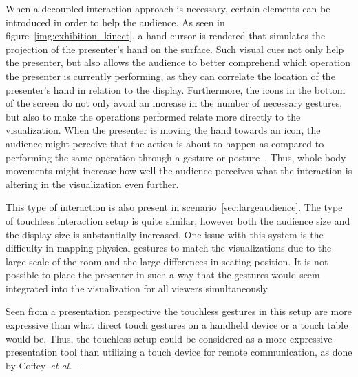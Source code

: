 \documentclass[review,journal]{vgtc}         %
\newcommand{\todo}[1]{\textbf{\textcolor{red}{[TODO: {#1}]}}}
\begin{document}
When a decoupled interaction approach is necessary, certain elements can be introduced in order to help the audience.
As seen in figure~\ref{img:exhibition_kinect}, a hand cursor is rendered that simulates the projection of the presenter's hand on the surface.
Such visual cues not only help the presenter, but also allows the audience to better comprehend which operation the presenter is currently performing, as they can correlate the location of the presenter's hand in relation to the display.
Furthermore, the icons in the bottom of the screen do not only avoid an increase in the number of necessary gestures, but also to make the operations performed relate more directly to the visualization. 
When the presenter is moving the hand towards an icon, the audience might perceive that the action is about to happen as compared to performing the same operation through a gesture or posture~\cite{isenberg:hal-00781237}. 
Thus, whole body movements \cite{978-0-85729-432-6, Shoemaker:2010:BIT:1868914.1868967} might increase how well the audience perceives what the interaction is altering in the visualization even further.

This type of interaction is also present in scenario~\ref{sec:largeaudience}. The type of touchless interaction setup is quite similar, however both the audience size and the display size is substantially increased.
One issue with this system is the difficulty in mapping physical gestures to match the visualizations due to the large scale of the room and the large differences in seating position.
It is not possible to place the presenter in such a way that the gestures would seem integrated into the visualization for all viewers simultaneously.

Seen from a presentation perspective the touchless gestures in this setup are more expressive than what direct touch gestures on a handheld device or a touch table would be.
Thus, the touchless setup could be considered as a more expressive presentation tool than utilizing a touch device for remote communication, as done by Coffey~\textit{et al.}~\cite{Coffey:2012:ISW:2360744.2360843}.




\end{document}
